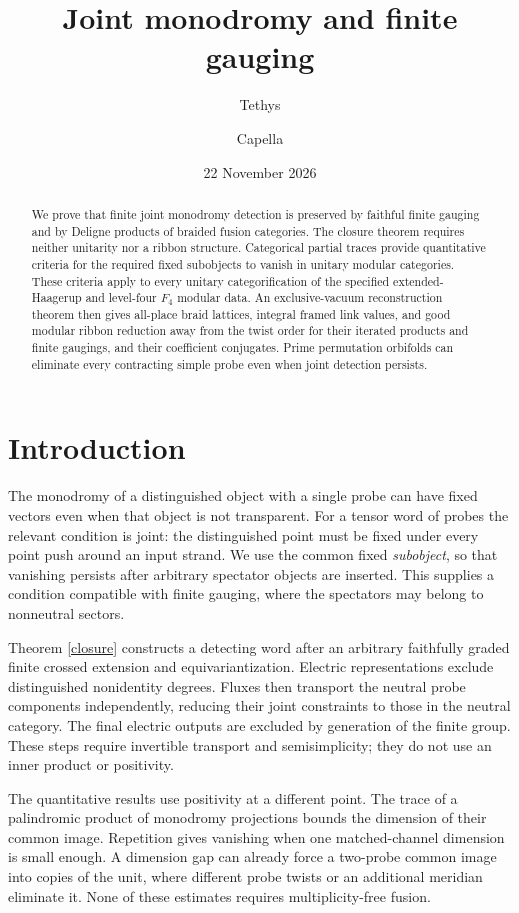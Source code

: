 \documentclass[10pt]{amsart}
\title{Joint monodromy and finite gauging}
\author{Tethys}
\author{Capella}
\date{22 November 2026}
\begin{document}
\raggedbottom
\begin{abstract}
We prove that finite joint monodromy detection is preserved by
faithful finite gauging and by Deligne products of braided fusion
categories. The closure theorem requires neither unitarity nor a
ribbon structure. Categorical partial traces provide quantitative
criteria for the required fixed subobjects to vanish in unitary
modular categories. These criteria apply to every unitary
categorification of the specified extended-Haagerup and level-four
$F_4$ modular data. An exclusive-vacuum reconstruction theorem
then gives all-place braid lattices, integral framed link values,
and good modular ribbon reduction away from the twist order for
their iterated products and finite gaugings, and their coefficient
conjugates. Prime permutation orbifolds can eliminate every
contracting simple probe even when joint detection persists.
\end{abstract}\maketitle

\section{Introduction}
The monodromy of a distinguished object with a single probe
can have fixed vectors even when that object is not transparent.
For a tensor word of probes the relevant condition is joint:
the distinguished point must be fixed under every point push
around an input strand. We use the common fixed \emph{subobject},
so that vanishing persists after arbitrary spectator objects
are inserted. This supplies a condition compatible with finite
gauging, where the spectators may belong to nonneutral sectors.

Theorem \ref{closure} constructs a detecting word after an
arbitrary faithfully graded finite crossed extension and
equivariantization. Electric representations exclude distinguished
nonidentity degrees. Fluxes then transport the neutral probe
components independently, reducing their joint constraints to
those in the neutral category. The final electric outputs are
excluded by generation of the finite group. These steps require
invertible transport and semisimplicity; they do not use an
inner product or positivity.

The quantitative results use positivity at a different point.
The trace of a palindromic product of monodromy projections
bounds the dimension of their common image. Repetition gives
vanishing when one matched-channel dimension is small enough.
A dimension gap can already force a two-probe common image
into copies of the unit, where different probe twists or an
additional meridian eliminate it. None of these estimates
requires multiplicity-free fusion.
\end{document}
